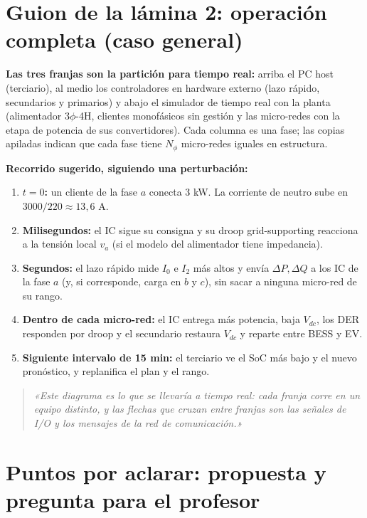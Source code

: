 \documentclass[10pt,a4paper]{article}
\newcommand{\di}[1]{\begin{quote}\itshape «#1»\end{quote}}
\begin{document}
\section{Guion de la lámina 2: operación completa (caso general)}
\textbf{Las tres franjas son la partición para tiempo real:} arriba el PC host (terciario), al medio los controladores en hardware externo (lazo rápido, secundarios y primarios) y abajo el simulador de tiempo real con la planta (alimentador 3$\phi$-4H, clientes monofásicos sin gestión y las micro-redes con la etapa de potencia de sus convertidores). Cada columna es una fase; las copias apiladas indican que cada fase tiene $N_\phi$ micro-redes iguales en estructura.

\textbf{Recorrido sugerido, siguiendo una perturbación:}
\begin{enumerate}
  \item \textbf{$t=0$:} un cliente de la fase $a$ conecta 3 kW. La corriente de neutro sube en $3000/220\approx13{,}6$ A.
  \item \textbf{Milisegundos:} el IC sigue su consigna y su droop grid-supporting reacciona a la tensión local $v_a$ (si el modelo del alimentador tiene impedancia).
  \item \textbf{Segundos:} el lazo rápido mide $I_0$ e $I_2$ más altos y envía $\Delta P,\Delta Q$ a los IC de la fase $a$ (y, si corresponde, carga en $b$ y $c$), sin sacar a ninguna micro-red de su rango.
  \item \textbf{Dentro de cada micro-red:} el IC entrega más potencia, baja $V_{dc}$, los DER responden por droop y el secundario restaura $V_{dc}$ y reparte entre BESS y EV.
  \item \textbf{Siguiente intervalo de 15 min:} el terciario ve el SoC más bajo y el nuevo pronóstico, y replanifica el plan y el rango.
\end{enumerate}
\di{Este diagrama es lo que se llevaría a tiempo real: cada franja corre en un equipo distinto, y las flechas que cruzan entre franjas son las señales de I/O y los mensajes de la red de comunicación.}

\section{Puntos por aclarar: propuesta y pregunta para el profesor}
\end{document}
